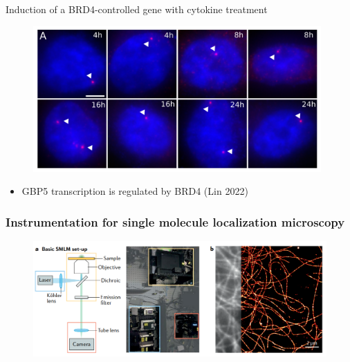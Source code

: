 \documentclass{beamer}					%
\begin{document}
\begin{frame}{Induction of a BRD4-controlled gene with cytokine treatment}
\begin{figure}
\includegraphics[width=11cm]{Figure-2.png}
\end{figure}
\begin{itemize}
\item GBP5 transcription is regulated by BRD4 (Lin 2022)
\end{itemize}
\end{frame}




\begin{frame}
\frametitle{Instrumentation for single molecule localization microscopy}

\begin{figure}
\includegraphics[width=12cm]{Setup.png}
\end{figure}

\end{frame}
\end{document}
